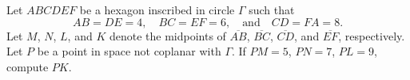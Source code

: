 Let $ABCDEF$ be a hexagon inscribed in circle $\Gamma$ such that \[AB=DE=4,\quad BC=EF=6,\quad\text{and}\quad CD=FA=8.\] Let $M$, $N$, $L$, and $K$ denote the midpoints of $\overline{AB}$, $\overline{BC}$, $\overline{CD}$, and $\overline{EF}$, respectively. Let $P$ be a point in space not coplanar with $\Gamma$. If $PM=5$, $PN=7$, $PL=9$, compute $PK$.